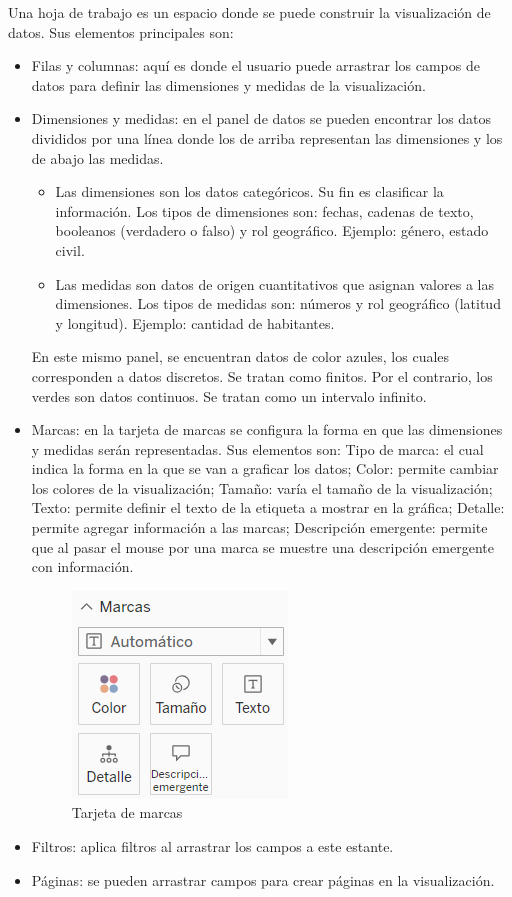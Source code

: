 \documentclass[a4paper, 12pt]{book}
\begin{document}
Una hoja de trabajo es un espacio donde se puede construir la visualización de datos. Sus elementos principales son:
\begin{itemize}
	\item Filas y columnas: aquí es donde el usuario puede arrastrar los campos de datos para definir las dimensiones y medidas de la visualización.
	\item Dimensiones y medidas: en el panel de datos se pueden encontrar los datos divididos por una línea donde los de arriba representan las dimensiones y los de abajo las medidas. 
	\begin{itemize}
		\item Las dimensiones son los datos categóricos. Su fin es clasificar la información. Los tipos de dimensiones son: fechas, cadenas de texto, booleanos (verdadero o falso) y rol geográfico. Ejemplo: género, estado civil.
		\item Las medidas son datos de origen cuantitativos que asignan valores a las dimensiones. Los tipos de medidas son: números y rol geográfico (latitud y longitud). Ejemplo: cantidad de habitantes.
	\end{itemize}
	En este mismo panel, se encuentran datos de color azules, los cuales corresponden a datos discretos. Se tratan como finitos. Por el contrario, los verdes son datos continuos. Se tratan como un intervalo infinito.
	\item Marcas: en la tarjeta de marcas se configura la forma en que las dimensiones y medidas serán representadas. Sus elementos son: Tipo de marca: el cual indica la forma en la que se van a graficar los datos; Color: permite cambiar los colores de la visualización; Tamaño: varía el tamaño de la visualización; Texto: permite definir el texto de la etiqueta a mostrar en la gráfica; Detalle: permite agregar información a las marcas; Descripción emergente: permite que al pasar el mouse por una marca se muestre una descripción emergente con información.
	\begin{figure}[H] 
		\centering 
		\includegraphics[width=0.3\linewidth]{marcas.png}
		\caption{Tarjeta de marcas}
	\end{figure}
	\item Filtros: aplica filtros al arrastrar los campos a este estante.
	\item Páginas: se pueden arrastrar campos para crear páginas en la visualización.
\end{itemize}
\end{document}
